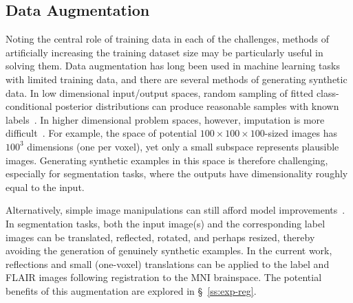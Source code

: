 \subsection{Data Augmentation}\label{ss:vlr-reg-aug}
Noting the central role of training data in each of the challenges,
methods of artificially increasing the training dataset size
may be particularly useful in solving them.
Data augmentation has long been used in machine learning tasks with limited training data,
and there are several methods of generating synthetic data.
In low dimensional input/output spaces,
random sampling of fitted class-conditional posterior distributions
can produce reasonable samples with known labels~\cite{Tanner1987}.
In higher dimensional problem spaces, however, imputation is more difficult~\cite{Goodfellow2014}.
For example, the space of potential $100\times100\times100$-sized images has $100^3$ dimensions
(one per voxel), yet only a small subspace represents plausible images.
Generating synthetic examples in this space is therefore challenging,
especially for segmentation tasks,
where the outputs have dimensionality roughly equal to the input.
\par
Alternatively, simple image manipulations can still afford model improvements~\cite{Krizhevsky2012}.
In segmentation tasks, both the input image(s) and the corresponding label images can be
translated, reflected, rotated, and perhaps resized,
thereby avoiding the generation of genuinely synthetic examples.
In the current work, reflections and small (one-voxel) translations
can be applied to the label and FLAIR images following registration to the MNI brainspace.
The potential benefits of this augmentation are explored in \S~\ref{ss:exp-reg}.
